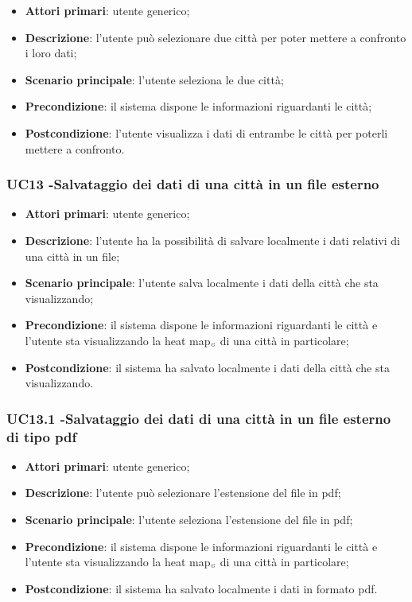 \begin{itemize}
	\item \textbf{Attori primari}: utente generico;
	\item \textbf{Descrizione}: l’utente può selezionare due città per poter mettere a confronto i loro dati;
	\item \textbf{Scenario principale}: l’utente seleziona le due città;
	\item \textbf{Precondizione}: il sistema dispone le informazioni riguardanti le città;
	\item \textbf{Postcondizione}: l'utente visualizza i dati di entrambe le città per poterli mettere a confronto. 
\end{itemize}

\subsubsection{UC13 -Salvataggio dei dati di una città in un file esterno}\label{CasiDUsoCasiDUsoFacoltativiTraUnUtenteEIlFrontEndElencoCasiDUsoUC13SalvataggioDeiDatiDiUnaCittaInUnFileEsterno}

\begin{itemize}
	\item \textbf{Attori primari}: utente generico;
	\item \textbf{Descrizione}: l’utente ha la possibilità di salvare localmente i dati relativi di una città in un file;
	\item \textbf{Scenario principale}: l’utente salva localmente i dati della città che sta visualizzando;
	\item \textbf{Precondizione}: il sistema dispone le informazioni riguardanti le città e  l’utente sta visualizzando la heat map$_{\scaleto{G}{3pt}}$ di una città in particolare;
	\item \textbf{Postcondizione}: il sistema ha salvato localmente i dati della città che sta visualizzando. 
\end{itemize}

\subsubsection{UC13.1 -Salvataggio dei dati di una città in un file esterno di tipo pdf}\label{CasiDUsoCasiDUsoFacoltativiTraUnUtenteEIlFrontEndElencoCasiDUsoUC131SalvataggioDeiDatiDiUnaCittaInUnFileEsternoDiTipoPdf}

\begin{itemize}
	\item \textbf{Attori primari}: utente generico;
	\item \textbf{Descrizione}: l’utente può selezionare l’estensione del file in pdf;
	\item \textbf{Scenario principale}: l’utente seleziona l’estensione del file in pdf;
	\item \textbf{Precondizione}: il sistema dispone le informazioni riguardanti le città e  l’utente sta visualizzando la heat map$_{\scaleto{G}{3pt}}$ di una città in particolare;
	\item \textbf{Postcondizione}: il sistema ha salvato localmente i dati in formato pdf.
\end{itemize}

